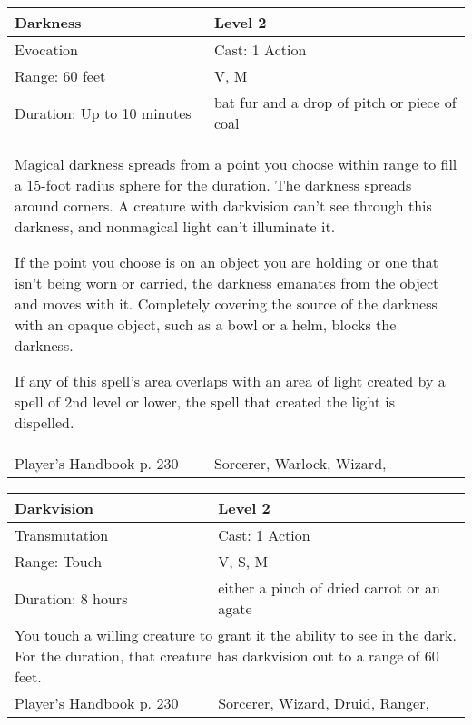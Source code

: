 \documentclass[11pt]{report}
\begin{document}
\begin{table}[H]
	\begin{tabular}{||p{6cm}|p{6cm}||}
		\hline\hline
		\bf{Darkness} & Level 2\\ \hline
		Evocation & Cast: 1 Action\\ \hline
		Range: 60 feet & V, M\\ \hline
		Duration: Up to 10 minutes & bat fur and a drop of pitch or piece of coal\\ \hline
		\multicolumn{2}{||p{12cm}||}{Magical darkness spreads from a point you choose within range to fill a 15-foot radius sphere for the duration.
The darkness spreads around corners. A creature with darkvision can’t see through this darkness, and nonmagical light can’t illuminate it. 

If the point you choose is on an object you are holding or one that isn’t being worn or carried, the darkness emanates from the object and moves with it. Completely covering the source of the darkness with an opaque object, such as a bowl or a helm, blocks the darkness.

If any of this spell’s area overlaps with an area of light created by a spell of 2nd level or lower, the spell that created the light is dispelled.}\\ \hline
Player's Handbook p. 230 & Sorcerer, Warlock, Wizard, \\ \hline\hline
	\end{tabular}
\end{table}

\begin{table}[H]
	\begin{tabular}{||p{6cm}|p{6cm}||}
		\hline\hline
		\bf{Darkvision} & Level 2\\ \hline
		Transmutation & Cast: 1 Action\\ \hline
		Range: Touch & V, S, M\\ \hline
		Duration: 8 hours & either a pinch of dried carrot or an agate\\ \hline
		\multicolumn{2}{||p{12cm}||}{You touch a willing creature to grant it the ability to see in the dark.
For the duration, that creature has darkvision out to a range of 60 feet.}\\ \hline
Player's Handbook p. 230 & Sorcerer, Wizard, Druid, Ranger, \\ \hline\hline
	\end{tabular}
\end{table}
\end{document}
